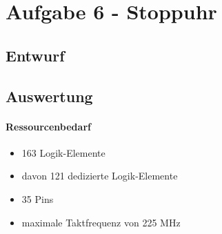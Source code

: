 \section{Aufgabe 6 - Stoppuhr}
\subsection{Entwurf}
 
\subsection{Auswertung}
	\paragraph{Ressourcenbedarf}
	\begin{itemize} 
	\item 163 Logik-Elemente
	\item davon 121 dedizierte Logik-Elemente
	\item 35 Pins 
	\item maximale Taktfrequenz von 225 MHz
	\end{itemize}
